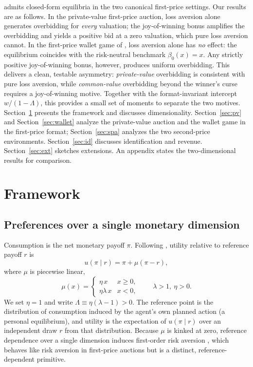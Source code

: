 \documentclass[11pt,a4paper]{article}
\theoremstyle{remark}
\begin{document}
admits closed-form equilibria in the two canonical first-price settings.
Our results are as follows. In the private-value first-price auction, loss aversion
alone generates overbidding for \emph{every} valuation; the joy-of-winning bonus
amplifies the overbidding and yields a positive bid at a zero valuation, which pure
loss aversion cannot. In the first-price wallet game of \citet{klemperer1998}, loss
aversion alone has \emph{no} effect: the equilibrium coincides with the risk-neutral
benchmark $\beta_0(x)=x$. Any strictly positive joy-of-winning bonus, however,
produces uniform overbidding. This delivers a clean, testable asymmetry:
\emph{private-value} overbidding is consistent with pure loss aversion, while
\emph{common-value} overbidding beyond the winner's curse requires a
joy-of-winning motive. Together with the format-invariant intercept $w/(1-\Lambda)$,
this provides a small set of moments to separate the two motives.
Section~\ref{sec:framework} presents the framework and discusses dimensionality.
Section~\ref{sec:pv} and Section~\ref{sec:wallet} analyze the private-value auction
and the wallet game in the first-price format; Section~\ref{sec:spa} analyzes the two
second-price environments. Section~\ref{sec:id} discusses identification and revenue.
Section~\ref{sec:ext} sketches extensions. An appendix states the two-dimensional
results for comparison.
\section{Framework}
\label{sec:framework}
\subsection{Preferences over a single monetary dimension}
Consumption is the net monetary payoff $\pi$. Following \citet{koszegiRabin2006},
utility relative to reference payoff $r$ is
\begin{equation}
u(\pi\mid r)=\pi+\mu(\pi-r),
\end{equation}
where $\mu$ is piecewise linear,
\begin{equation}
\mu(x)=\begin{cases}\eta\,x & x\ge0,\\ \eta\lambda\,x & x<0,\end{cases}
\qquad \lambda>1,\ \eta>0 .
\end{equation}
We set $\eta=1$ and write $\Lambda\equiv\eta(\lambda-1)>0$. The reference point is the
distribution of consumption induced by the agent's own planned action (a personal
equilibrium), and utility is the expectation of $u(\pi\mid r)$ over an independent
draw $r$ from that distribution. Because $\mu$ is kinked at zero, reference
dependence over a single dimension induces first-order risk aversion
\citep{koszegiRabin2007}, which behaves like risk aversion in first-price auctions
but is a distinct, reference-dependent primitive.
\end{document}
